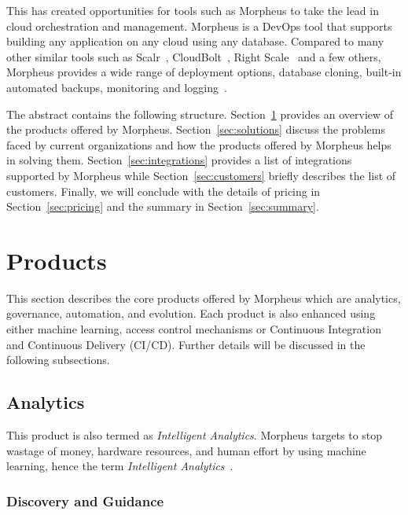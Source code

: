 This has created opportunities for tools such as Morpheus to take the lead in
cloud orchestration and management. Morpheus is a DevOps tool that supports
building any application on any cloud using any database. Compared to many
other similar tools such as Scalr~\cite{hid-sp18-416-www-scalr},
CloudBolt~\cite{hid-sp18-416-www-cloudbolt}, Right
Scale~\cite{hid-sp18-416-www-rightscale} and a few others, Morpheus provides a
wide range of deployment options, database cloning, built-in automated backups,
monitoring and
logging~\cite{hid-sp18-416-www-cloud-management-tools-comparison}.

The abstract contains the following structure. Section~\ref{sec:products}
provides an overview of the products offered by Morpheus.
Section~\ref{sec:solutions} discuss the problems faced by current organizations
and how the products offered by Morpheus helps in solving them.
Section~\ref{sec:integrations} provides a list of integrations supported by
Morpheus while Section~\ref{sec:customers} briefly describes the list of
customers. Finally, we will conclude with the details of pricing in
Section~\ref{sec:pricing} and the summary in Section~\ref{sec:summary}.

\section{Products} 
\label{sec:products} 

This section describes the core products offered by Morpheus which are 
analytics, governance, automation, and evolution. Each product is also 
enhanced using either machine learning, access control mechanisms or 
Continuous Integration and Continuous Delivery (CI/CD). Further details will 
be discussed in the following subsections.

\subsection{Analytics}

This product is also termed as \textit{Intelligent Analytics}. Morpheus targets
to stop wastage of money, hardware resources, and human effort by using machine
learning, hence the term \textit{Intelligent 
Analytics}~\cite{hid-sp18-416-www-morpheus-product-guide}.

\subsubsection{Discovery and Guidance}

